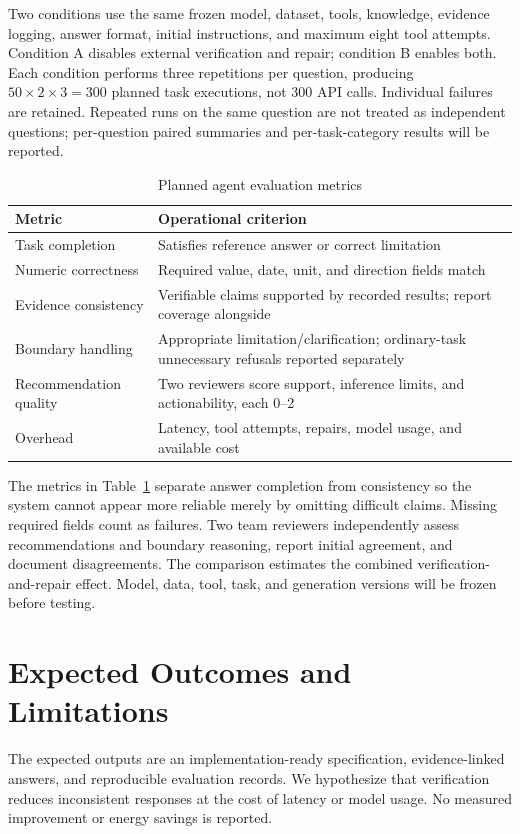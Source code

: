 \documentclass[conference]{IEEEtran}
\begin{document}
Two conditions use the same frozen model, dataset, tools, knowledge, evidence logging, answer format, initial instructions, and maximum eight tool attempts. Condition A disables external verification and repair; condition B enables both. Each condition performs three repetitions per question, producing $50\times2\times3=300$ planned task executions, not 300 API calls. Individual failures are retained. Repeated runs on the same question are not treated as independent questions; per-question paired summaries and per-task-category results will be reported.

\begin{table}[t]
\caption{Planned agent evaluation metrics}
\label{tab:metrics}
\centering\footnotesize
\begin{tabularx}{\columnwidth}{@{}p{}X@{}}
\toprule
Metric & Operational criterion \\
\midrule
Task completion & Satisfies reference answer or correct limitation \\
Numeric correctness & Required value, date, unit, and direction fields match \\
Evidence consistency & Verifiable claims supported by recorded results; report coverage alongside \\
Boundary handling & Appropriate limitation/clarification; ordinary-task unnecessary refusals reported separately \\
Recommendation quality & Two reviewers score support, inference limits, and actionability, each 0--2 \\
Overhead & Latency, tool attempts, repairs, model usage, and available cost \\
\bottomrule
\end{tabularx}
\end{table}
The metrics in Table~\ref{tab:metrics} separate answer completion from consistency so the system cannot appear more reliable merely by omitting difficult claims. Missing required fields count as failures. Two team reviewers independently assess recommendations and boundary reasoning, report initial agreement, and document disagreements. The comparison estimates the combined verification-and-repair effect. Model, data, tool, task, and generation versions will be frozen before testing.

\section{Expected Outcomes and Limitations}
The expected outputs are an implementation-ready specification, evidence-linked answers, and reproducible evaluation records. We hypothesize that verification reduces inconsistent responses at the cost of latency or model usage. No measured improvement or energy savings is reported.
\end{document}
